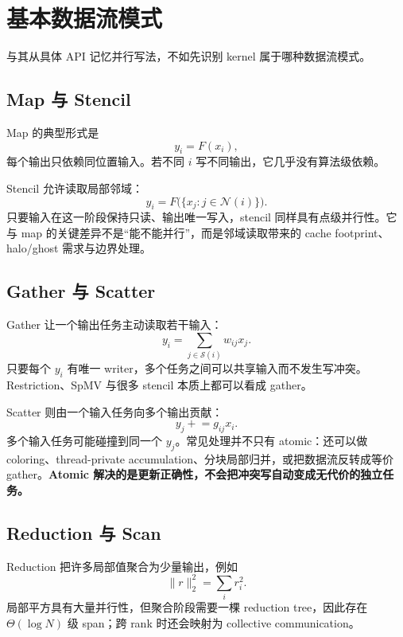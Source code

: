 \section{基本数据流模式}

与其从具体 API 记忆并行写法，不如先识别 kernel 属于哪种数据流模式。

\subsection{Map 与 Stencil}

Map 的典型形式是
\begin{equation}
y_i=F(x_i),
\end{equation}
每个输出只依赖同位置输入。若不同 $i$ 写不同输出，它几乎没有算法级依赖。

Stencil 允许读取局部邻域：
\begin{equation}
y_i=F\bigl(\{x_j:j\in\mathcal N(i)\}\bigr).
\end{equation}
只要输入在这一阶段保持只读、输出唯一写入，stencil 同样具有点级并行性。它与 map 的关键差异不是“能不能并行”，而是邻域读取带来的 cache footprint、halo/ghost 需求与边界处理。

\subsection{Gather 与 Scatter}

Gather 让一个输出任务主动读取若干输入：
\begin{equation}
y_i=\sum_{j\in\mathcal S(i)}w_{ij}x_j.
\end{equation}
只要每个 $y_i$ 有唯一 writer，多个任务之间可以共享输入而不发生写冲突。Restriction、SpMV 与很多 stencil 本质上都可以看成 gather。

Scatter 则由一个输入任务向多个输出贡献：
\begin{equation}
y_j\mathrel{+}=g_{ij}x_i.
\end{equation}
多个输入任务可能碰撞到同一个 $y_j$。常见处理并不只有 atomic：还可以做 coloring、thread-private accumulation、分块局部归并，或把数据流反转成等价 gather。\textbf{Atomic 解决的是更新正确性，不会把冲突写自动变成无代价的独立任务。}

\subsection{Reduction 与 Scan}

Reduction 把许多局部值聚合为少量输出，例如
\begin{equation}
\|r\|_2^2=\sum_i r_i^2.
\end{equation}
局部平方具有大量并行性，但聚合阶段需要一棵 reduction tree，因此存在 $\Theta(\log N)$ 级 span；跨 rank 时还会映射为 collective communication。

